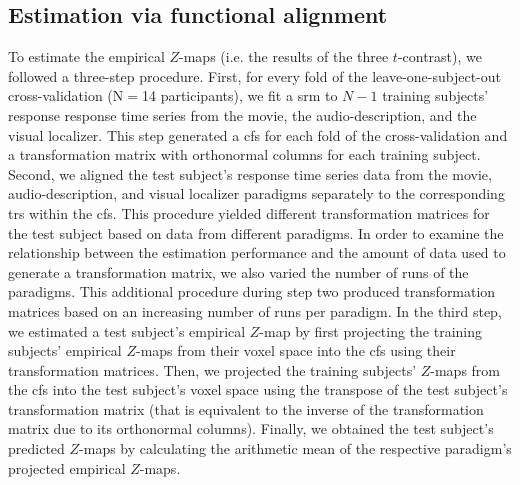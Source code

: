\subsection{Estimation via functional alignment}
%
To estimate the empirical $Z$-maps (i.e. the results of the three $t$-contrast),
we followed a three-step procedure.
First, for every fold of the leave-one-subject-out cross-validation (N$=$14
participants), we fit a \ac{srm} to $N-1$ training subjects' response response
time series from the movie, the audio-description, and the visual localizer.
This step generated a \ac{cfs} for each fold of the cross-validation and a
transformation matrix with orthonormal columns for each training subject.
Second, we aligned the test subject's response time series data from the movie,
audio-description, and visual localizer paradigms separately to the
corresponding \acp{tr} within the \ac{cfs}.
%
This procedure yielded different transformation matrices for the test subject
based on data from different paradigms.
In order to examine the relationship between the estimation performance and the
amount of data used to generate a transformation matrix, we also varied the
number of runs of the paradigms.
%
This additional procedure during step two produced transformation matrices based
on an increasing number of runs per paradigm.
%
In the third step, we estimated a test subject's empirical $Z$-map by first
projecting the training subjects' empirical $Z$-maps from their voxel space into
the \ac{cfs} using their transformation matrices.
Then, we projected the training subjects' $Z$-maps from the \ac{cfs} into the
test subject's voxel space using the transpose of the test subject's
transformation matrix (that is equivalent to the inverse of the transformation
matrix due to its orthonormal columns).
Finally, we obtained the test subject's predicted $Z$-maps by calculating the
arithmetic mean of the respective paradigm's projected empirical $Z$-maps.



